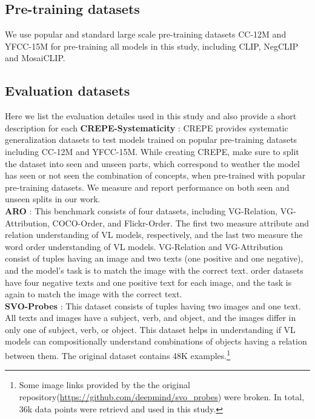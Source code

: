 \documentclass[11pt]{article}
\newcommand{\methodcomp}{MosaiCLIP}
\newcommand{\clip}{CLIP}
\newcommand{\negclip}{NegCLIP}
\begin{document}
\begin{table}[h!]
\subsection{Pre-training datasets}
We use popular and standard large scale pre-training datasets CC-12M \citep{changpinyo2021cc12m} and YFCC-15M \citep{thomee2016yfcc100m} for pre-training all models in this study, including \clip{}, \negclip{} and \methodcomp{}.
\subsection{Evaluation datasets}
\label{eval_data_details}
Here we list the evaluation detailes used in this study and also provide a short description for each
\noindent \textbf{CREPE-Systematicity} \cite{ma2022crepe}: CREPE provides systematic generalization datasets to test models trained on popular pre-training datasets including CC-12M and YFCC-15M. While creating CREPE, \citet{ma2022crepe} make sure to split the dataset into seen and unseen parts, which correspond to weather the model has seen or not seen the combination of concepts, when pre-trained with popular pre-training datasets. We measure and report performance on both seen and unseen splits in our work.\\
\noindent \textbf{ARO} \cite{yuksekgonul2022and}: This benchmark consists of four datasets, including VG-Relation, VG-Attribution, COCO-Order, and Flickr-Order. The first two measure attribute and relation understanding of VL models, respectively, and the last two measure the word order understanding of VL models. VG-Relation and VG-Attribution consist of tuples having an image and two texts (one positive and one negative), and the model's task is to match the image with the correct text. order datasets have four negative texts and one positive text for each image, and the task is again to match the image with the correct text.\\
\noindent \textbf{SVO-Probes} \cite{hendricks-nematzadeh-2021-probing}: This dataset consists of tuples having two images and one text. All texts and images have a subject, verb, and object, and the images differ in only one of subject, verb, or object. This dataset helps in understanding if VL models can compositionally understand combinations of objects having a relation between them. The original dataset contains 48K examples.\footnote{Some image links provided by the the original repository(\url{https://github.com/deepmind/svo_probes}) were broken. In total, 36k data points were retrievd and used in this study.}\\ 

\end{table}
\end{document}
